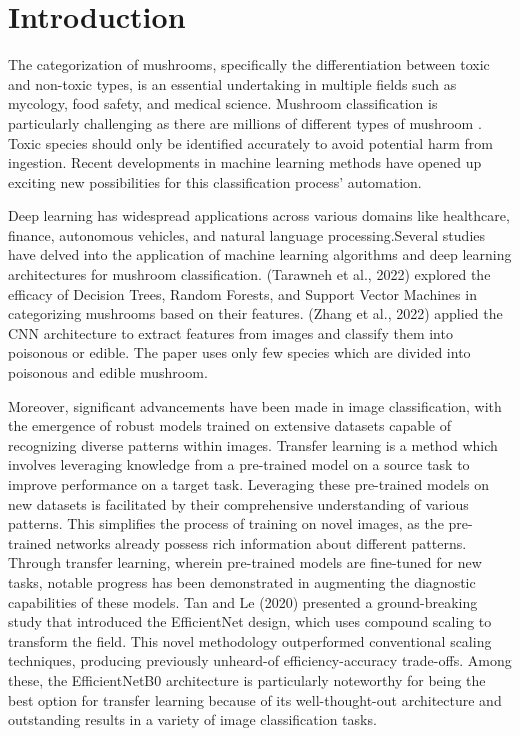 \section{Introduction}

The categorization of mushrooms, specifically the differentiation between toxic and non-toxic types, is an essential undertaking in multiple fields such as mycology, food safety, and medical science. Mushroom classification is particularly challenging as there are millions of different types of mushroom \cite{wibowo2018classification}. Toxic species should only be identified accurately to avoid potential harm from ingestion. Recent developments in machine learning methods have opened up exciting new possibilities for this classification process' automation.

Deep learning has widespread applications across various domains like healthcare, finance, autonomous vehicles, and natural language processing\cite{alzubaidi2021review}.Several studies have delved into the application of machine learning algorithms and deep learning architectures for mushroom classification. (Tarawneh et al., 2022) explored the efficacy of Decision Trees, Random Forests, and Support Vector Machines in categorizing mushrooms based on their features\cite{inproceedings}. (Zhang et al., 2022) applied the CNN architecture to extract features from images and classify them into poisonous or edible. The paper uses only few species which are divided into poisonous and edible mushroom.  

Moreover, significant advancements have been made in image classification, with the emergence of robust models trained on extensive datasets capable of recognizing diverse patterns within images. Transfer learning is a method which involves leveraging knowledge from a pre-trained model on a source task to improve performance on a target task\cite{hussain2019study}. Leveraging these pre-trained models on new datasets is facilitated by their comprehensive understanding of various patterns. This simplifies the process of training on novel images, as the pre-trained networks already possess rich information about different patterns. Through transfer learning, wherein pre-trained models are fine-tuned for new tasks, notable progress has been demonstrated in augmenting the diagnostic capabilities of these models. Tan and Le (2020) presented a ground-breaking study that introduced the EfficientNet design, which uses compound scaling to transform the field\cite{tan2020efficientnet}. This novel methodology outperformed conventional scaling techniques, producing previously unheard-of efficiency-accuracy trade-offs. Among these, the EfficientNetB0 architecture is particularly noteworthy for being the best option for transfer learning because of its well-thought-out architecture and outstanding results in a variety of image classification tasks.

